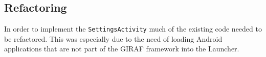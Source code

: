 \subsection{Refactoring}\label{sect:sprint3:refactoring}
In order to implement the \lstinline!SettingsActivity! much of the existing code needed to be refactored.
This was especially due to the need of loading Android applications that are not part of the GIRAF framework  into the Launcher. 

